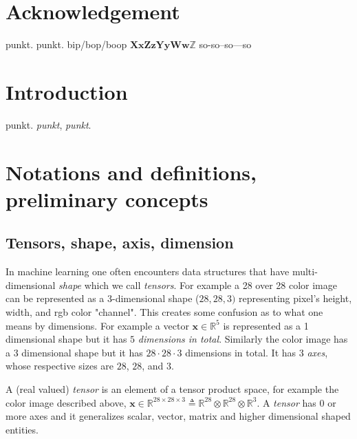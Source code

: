 \documentclass[11pt, a4paper]{report}
\theoremstyle{plain}
\theoremstyle{definition}
\theoremstyle{remark}
\newcommand{\R}{\mathbb{R}}
\newcommand{\X}{\mathbf{X}}
\newcommand{\x}{\mathbf{x}}
\newcommand{\Z}{\mathbf{Z}}
\newcommand{\z}{\mathbf{z}}
\newcommand{\Y}{\mathbf{Y}}
\newcommand{\y}{\mathbf{y}}
\newcommand{\W}{\mathbf{W}}
\newcommand{\w}{\mathbf{w}}
\begin{document}
\chapter*{Acknowledgement}
punkt.\cite{kingma2013auto}
punkt.
bip/bop\slash boop
$\X \x \Z \z \Y \y \W \w \mathbb{Z}$
so-so--so---so


\listoffigures

\tableofcontents

\chapter{Introduction} punkt. \emph{punkt}, \textit{punkt}.

\chapter{Notations and definitions, preliminary concepts}


\section{Tensors, shape, axis, dimension}
In machine learning one often encounters data structures that have
multi-dimensional \emph{shape} which we call \emph{tensors}. For example a 28
over 28 color image can be represented as a 3-dimensional shape ($28, 28, 3)$
representing pixel's height, width, and rgb color "channel". This creates some
confusion as to what one means by dimensions. For example a vector $\x \in \R^5$
is represented as a 1 dimensional shape but it has $5$ \emph{dimensions in
total}. Similarly the color image has a $3$ dimensional shape but it has $28
\cdot 28 \cdot 3$ dimensions in total. It has 3 \emph{axes}, whose respective
sizes are $28$, $28$, and $3$. 

A (real valued) \emph{tensor} is an element of a tensor product space, for
example the color image described above, $\x \in  \R^{28 \times 28 \times 3}
\triangleq \R^{28} \otimes \R^{28} \otimes \R^3$. A \emph{tensor} has $0$ or
more axes and it generalizes scalar, vector, matrix and higher dimensional
shaped entities.
\end{document}
